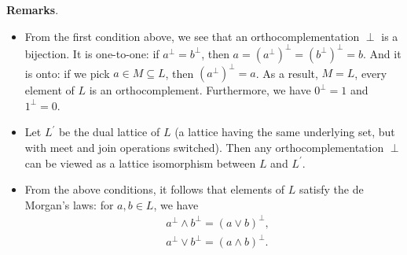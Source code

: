 \documentclass[12pt]{article}
\begin{document}
\textbf{Remarks}.
\begin{itemize}
\item From the first condition above, we see that an orthocomplementation $\perp$ is a bijection.  It is one-to-one: if $a^{\perp}=b^{\perp}$, then
$a=(a^{\perp})^{\perp}=(b^{\perp})^{\perp}=b$.  And it is onto: if we pick $a\in
M\subseteq L$, then $(a^{\perp})^{\perp}=a$.  As a result, $M=L$, every element of $L$ is an orthocomplement.  Furthermore, we have $0^{\perp}=1$ and $1^{\perp}=0$.
\item Let $L^{\prime}$ be the dual lattice of $L$ (a lattice having the same underlying set, but with meet and join operations switched).  Then any orthocomplementation $\perp$ can be viewed as a lattice isomorphism between $L$ and $L^{\prime}$.
\item From the above conditions, it follows that elements of $L$ satisfy the de Morgan's laws: for $a,b\in L$, we have
\begin{align}
& a^{\perp}\wedge b^{\perp}=(a\vee b)^{\perp},\\
& a^{\perp}\vee b^{\perp}=(a\wedge b)^{\perp}.
\end{align}


\end{itemize}
\end{document}
